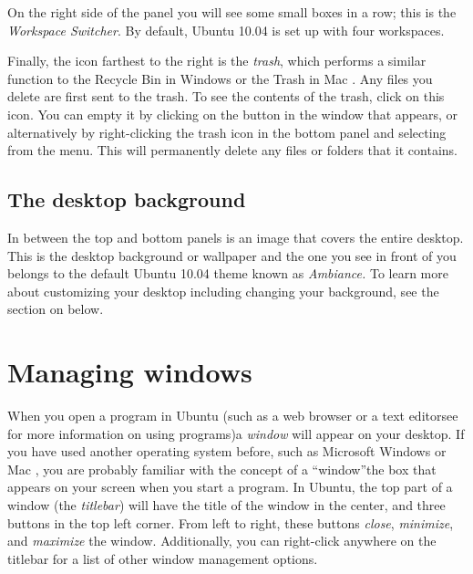 On the right side of the panel you will see some small boxes in a row; this is the \emph{Workspace Switcher}. By default, Ubuntu 10.04 is set up with four workspaces.

Finally, the icon farthest to the right is the \emph{trash}, which performs a similar function to the Recycle Bin in Windows or the Trash in Mac . Any files you delete are first sent to the trash. To see the contents of the trash, click on this icon. You can empty it by clicking on the  button in the window that appears, or alternatively by right-clicking the trash icon in the bottom panel and selecting  from the menu. This will permanently delete any files or folders that it contains.

\subsection{The desktop background}
In between the top and bottom panels is an image that covers the entire desktop. This is the desktop background or wallpaper and the one you see in front of you belongs to the default Ubuntu 10.04 theme known as \emph{Ambiance.} To learn more about customizing your desktop including changing your background, see the section on  below.

\section{Managing windows}
\label{sec:managing-windows}
When you open a program in Ubuntu (such as a web browser or a text editor\dash see  for more information on using programs)\dash a \emph{window} will appear on your desktop. If you have used another operating system before, such as Microsoft Windows or Mac , you are probably familiar with the concept of a ``window''\dash the box that appears on your screen when you start a program. In Ubuntu, the top part of a window (the \emph{titlebar}) will have the title of the window in the center, and three buttons in the top left corner. From left to right, these buttons \emph{close}, \emph{minimize}, and \emph{maximize} the window. Additionally, you can right-click anywhere on the titlebar for a list of other window management options. 

